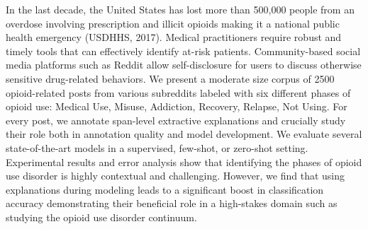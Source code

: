 In the last decade, the United States has lost more than 500,000 people from an overdose involving prescription and illicit opioids making it a national public health emergency (USDHHS, 2017). Medical practitioners require robust and timely tools that can effectively identify at-risk patients. Community-based social media platforms such as Reddit allow self-disclosure for users to discuss otherwise sensitive drug-related behaviors. We present a moderate size corpus of 2500 opioid-related posts from various subreddits labeled with six different phases of opioid use: Medical Use, Misuse, Addiction, Recovery, Relapse, Not Using. For every post, we annotate span-level extractive explanations and crucially study their role both in annotation quality and model development. We evaluate several state-of-the-art models in a supervised, few-shot, or zero-shot setting. Experimental results and error analysis show that identifying the phases of opioid use disorder is highly contextual and challenging. However, we find that using explanations during modeling leads to a significant boost in classification accuracy demonstrating their beneficial role in a high-stakes domain such as studying the opioid use disorder continuum.